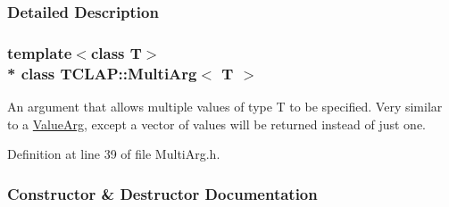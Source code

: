 \subsubsection{Detailed Description}
\subsubsection*{template$<$class T$>$\\*
class T\+C\+L\+A\+P\+::\+Multi\+Arg$<$ T $>$}

An argument that allows multiple values of type T to be specified. Very similar to a \hyperlink{classTCLAP_1_1ValueArg}{Value\+Arg}, except a vector of values will be returned instead of just one. 

Definition at line 39 of file Multi\+Arg.\+h.



\subsubsection{Constructor \& Destructor Documentation}
